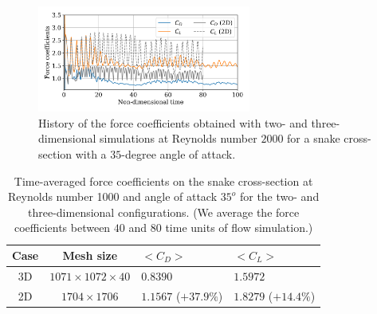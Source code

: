 \documentclass[10pt,journal,compsoc]{IEEEtran}
\begin{document}
\begin{figure}[!ht]
    \centering
    \includegraphics[width=7cm]{figures/forceCoefficientsCompare2D.png}
    \caption{History of the force coefficients obtained with two- and three-dimensional simulations at Reynolds number $2000$ for a snake cross-section with a $35$-degree angle of attack.}
    \label{fig:force_coefficients}
\end{figure}

\begin{table}[!t]
    \caption{Time-averaged force coefficients on the snake cross-section at Reynolds number 1000 and angle of attack $35^o$ for the two- and three-dimensional configurations. (We average the force coefficients between $40$ and $80$ time units of flow simulation.)}
    \label{tab:force_coefficients}
    \centering
    \begin{tabular}{ccll}
        \hline
        Case & Mesh size & $<C_D>$ & $<C_L>$ \\
        \hline
        3D & $1071 \times 1072 \times 40$ & $0.8390$ & $1.5972$ \\
        2D & $1704 \times 1706$ & $1.1567$ ($+37.9\%$) & $1.8279$ ($+14.4\%$) \\
        \hline
    \end{tabular}
\end{table}




%
\end{document}

